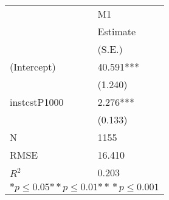 \begin{tabular}{*{2}{l}}
\hline
                  & M1   \tabularnewline
                   &Estimate \tabularnewline
                 &(S.E.) \tabularnewline
 \hline
 \hline
   (Intercept)     &40.591*** \tabularnewline
                 &(1.240)  \tabularnewline
   instcstP1000    &2.276*** \tabularnewline
                 &(0.133)  \tabularnewline
 \hline
 N                 &1155       \tabularnewline
 RMSE             &16.410   \tabularnewline
 $R^2$             &0.203   \tabularnewline
 \hline
\hline
 
 \multicolumn{2}{c}{${*  p}\le 0.05$${*\!\!*  p}\le 0.01$${*\!\!*\!\!*  p}\le 0.001$}\tabularnewline
 \end{tabular}
